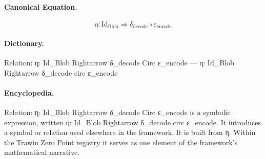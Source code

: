 \paragraph{Canonical Equation.}
\[
\eta: \text{Id}_{\text{Blob}} \Rightarrow \delta_{\text{decode}} \circ \varepsilon_{\text{encode}}
\]

\paragraph{Dictionary.}
Relation: η: Id\_Blob Rightarrow δ\_decode Circ ε\_encode — η: Id\_Blob Rightarrow δ\_decode circ ε\_encode

\paragraph{Encyclopedia.}
Relation: η: Id\_Blob Rightarrow δ\_decode Circ ε\_encode is a symbolic expression, written η: Id\_Blob Rightarrow δ\_decode circ ε\_encode. It introduces a symbol or relation used elsewhere in the framework. It is built from η. Within the Trawin Zero Point registry it serves as one element of the framework's mathematical narrative.
